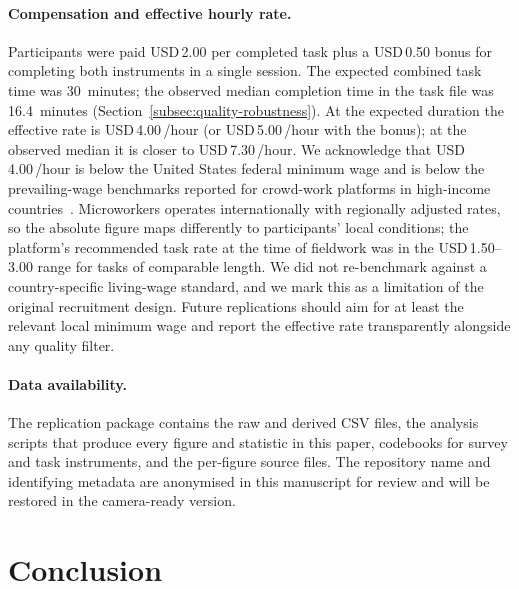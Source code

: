 \documentclass[11pt,a4paper]{article}
\makeatletter
\let\@oldsection\section
\renewcommand{\section}{\FloatBarrier\@oldsection}
\makeatother
\begin{document}
\paragraph{Compensation and effective hourly rate.} Participants were
paid USD\,2.00 per completed task plus a USD\,0.50 bonus for completing
both instruments in a single session. The expected combined task time
was 30~minutes; the observed median completion time in the task file
was 16.4~minutes (Section~\ref{subsec:quality-robustness}). At the
expected duration the effective rate is USD\,4.00\,/hour (or
USD\,5.00\,/hour with the bonus); at the observed median it is closer
to USD\,7.30\,/hour. We acknowledge that USD\,4.00\,/hour is below the
United States federal minimum wage and is below the prevailing-wage
benchmarks reported for crowd-work platforms in
high-income countries~\citep{kang:etal:2015}. Microworkers operates
internationally with regionally adjusted rates, so the absolute figure
maps differently to participants' local conditions; the platform's
recommended task rate at the time of fieldwork was in the
USD\,1.50--3.00 range for tasks of comparable length. We did not
re-benchmark against a country-specific living-wage standard, and we
mark this as a limitation of the original recruitment design. Future
replications should aim for at least the relevant local minimum wage
and report the effective rate transparently alongside any quality
filter.

\paragraph{Data availability.} The replication package contains the
raw and derived CSV files, the analysis scripts that produce every
figure and statistic in this paper, codebooks for survey and task
instruments, and the per-figure source files. The repository name and
identifying metadata are anonymised in this manuscript for review and
will be restored in the camera-ready version.

\section{Conclusion}
\label{sec:conclusion}
\end{document}

